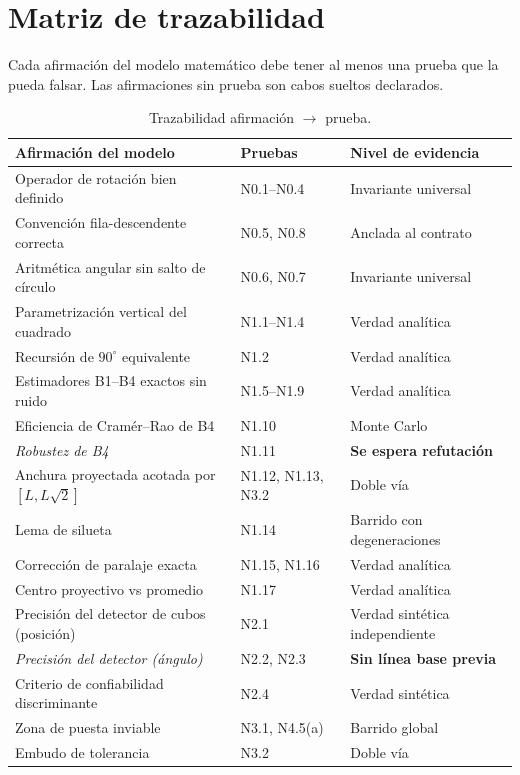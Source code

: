 \documentclass[11pt,a4paper]{article}
\newcommand{\grados}{^{\circ}}
\begin{document}
\section{Matriz de trazabilidad}

Cada afirmación del modelo matemático debe tener al menos una prueba que la pueda
falsar. Las afirmaciones sin prueba son cabos sueltos declarados.

\begin{table}[htbp]
\centering
\small
\caption{Trazabilidad afirmación $\to$ prueba.}
\begin{tabular}{p{6.6cm}p{3.3cm}p{4.2cm}}
\toprule
Afirmación del modelo & Pruebas & Nivel de evidencia \\
\midrule
Operador de rotación bien definido & N0.1--N0.4 & Invariante universal \\
Convención fila-descendente correcta & N0.5, N0.8 & Anclada al contrato \\
Aritmética angular sin salto de círculo & N0.6, N0.7 & Invariante universal \\
Parametrización vertical del cuadrado & N1.1--N1.4 & Verdad analítica \\
Recursión de $90\grados$ equivalente & N1.2 & Verdad analítica \\
Estimadores B1--B4 exactos sin ruido & N1.5--N1.9 & Verdad analítica \\
Eficiencia de Cramér--Rao de B4 & N1.10 & Monte Carlo \\
\textit{Robustez de B4} & N1.11 & \textbf{Se espera refutación} \\
Anchura proyectada acotada por $[L,L\sqrt2]$ & N1.12, N1.13, N3.2 & Doble vía \\
Lema de silueta & N1.14 & Barrido con degeneraciones \\
Corrección de paralaje exacta & N1.15, N1.16 & Verdad analítica \\
Centro proyectivo vs promedio & N1.17 & Verdad analítica \\
Precisión del detector de cubos (posición) & N2.1 & Verdad sintética independiente \\
\textit{Precisión del detector (ángulo)} & N2.2, N2.3 & \textbf{Sin línea base previa} \\
Criterio de confiabilidad discriminante & N2.4 & Verdad sintética \\
Zona de puesta inviable & N3.1, N4.5(a) & Barrido global \\
Embudo de tolerancia & N3.2 & Doble vía \\

\end{tabular}
\end{table}
\end{document}
